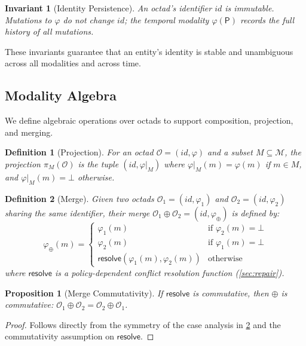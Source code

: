 \documentclass[11pt,twocolumn]{article}
\newtheorem{definition}{Definition}[section]
\newtheorem{proposition}[theorem]{Proposition}
\newtheorem{invariant}{Invariant}[section]
\newcommand{\octad}{\mathcal{O}}
\newcommand{\modset}{\mathcal{M}}
\begin{document}
\begin{invariant}[Identity Persistence]\label{inv:persist}
An octad's identifier $\mathit{id}$ is immutable.  Mutations to $\varphi$ do
not change $\mathit{id}$; the temporal modality $\varphi(\mathsf{P})$ records the
full history of all mutations.
\end{invariant}

These invariants guarantee that an entity's identity is stable and
unambiguous across all modalities and across time.

\subsection{Modality Algebra}\label{sec:modality-algebra}

We define algebraic operations over octads to support composition, projection,
and merging.

\begin{definition}[Projection]\label{def:projection}
For an octad $\octad = (\mathit{id}, \varphi)$ and a subset
$M \subseteq \modset$, the \emph{projection} $\pi_M(\octad)$ is the tuple
$(\mathit{id}, \varphi|_M)$ where $\varphi|_M(m) = \varphi(m)$ if $m \in M$,
and $\varphi|_M(m) = \bot$ otherwise.
\end{definition}

\begin{definition}[Merge]\label{def:merge}
Given two octads $\octad_1 = (\mathit{id}, \varphi_1)$ and
$\octad_2 = (\mathit{id}, \varphi_2)$ sharing the same identifier, their
\emph{merge} $\octad_1 \oplus \octad_2 = (\mathit{id}, \varphi_\oplus)$ is
defined by:
\[
  \varphi_\oplus(m) = \begin{cases}
    \varphi_1(m) & \text{if } \varphi_2(m) = \bot \\
    \varphi_2(m) & \text{if } \varphi_1(m) = \bot \\
    \mathsf{resolve}(\varphi_1(m), \varphi_2(m)) & \text{otherwise}
  \end{cases}
\]
where $\mathsf{resolve}$ is a policy-dependent conflict resolution function
(\cref{sec:repair}).
\end{definition}

\begin{proposition}[Merge Commutativity]
If $\mathsf{resolve}$ is commutative, then $\oplus$ is commutative:
$\octad_1 \oplus \octad_2 = \octad_2 \oplus \octad_1$.
\end{proposition}

\begin{proof}
Follows directly from the symmetry of the case analysis in
\cref{def:merge} and the commutativity assumption on $\mathsf{resolve}$.
\end{proof}
\end{document}

